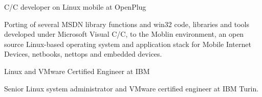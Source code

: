 
   {C/C\plusplus{} developer on Linux mobile at OpenPlug}

Porting of several MSDN library functions and win32 code, libraries and tools
developed under Microsoft Visual C/C\plusplus, to the Moblin environment,
an open source Linux-based operating system and application stack for
Mobile Internet Devices, netbooks, nettops and embedded devices.

%

\vfill\eject

   {Linux and VMware Certified Engineer at IBM}

Senior Linux system administrator and VMware certified engineer at
IBM Turin.

%

